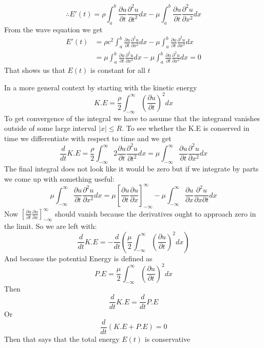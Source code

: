 \[
\therefore E'(t) = \rho \int_{a}^{b} \frac{\partial u}{\partial t}\frac{\partial^2 u}{\partial t^2} dx -\mu \int_{a}^{b} \frac{\partial u}{\partial t}\frac{\partial^2 u}{\partial x^2} dx    
\]
From the wave equation we get 
\begin{align*}
    E'(t) &= \rho c^2 \int_{a}^{b} \frac{\partial u}{\partial t}\frac{\partial^2 u}{\partial x^2} dx -\mu \int_{a}^{b} \frac{\partial u}{\partial t}\frac{\partial^2 u}{\partial x^2} dx    
    \\
    &= \mu \int_{a}^{b} \frac{\partial u}{\partial t}\frac{\partial^2 u}{\partial x^2} dx -\mu \int_{a}^{b} \frac{\partial u}{\partial t}\frac{\partial^2 u}{\partial x^2} dx = 0
\end{align*}
That shows us that $E(t)$ is constant for all $t$
\par
In a more general context by starting with the kinetic energy
\[
K.E = \frac{\rho}{2} \int_{-\infty}^{\infty} {\left(\frac{\partial u}{\partial t}\right)}^2 dx    
\]
To get convergence of the integral we have to assume that the integrand vanishes
outside of some large interval $|x| \leq R$.
To see whether the K.E is conserved in time
we differentiate with respect to time and we get
\[
\frac{d}{dt}K.E = \frac{\rho}{2} \int_{-\infty}^{\infty} 2\frac{\partial u}{\partial t}\frac{\partial^2 u}{\partial t^2} dx = \mu \int_{-\infty}^{\infty} \frac{\partial u}{\partial t}\frac{\partial^2 u}{\partial x^2} dx
\]
The final integral does not look like it would be zero but if we integrate by
parts we come up with something useful:
\[
    \mu \int_{-\infty}^{\infty} \frac{\partial u}{\partial t}\frac{\partial^2 u}{\partial x^2} dx = \mu \left[\frac{\partial u}{\partial t}\frac{\partial u}{\partial x}\right]_{-\infty}^{\infty} - \mu \int_{-\infty}^{\infty} \frac{\partial u}{\partial x}\frac{\partial^2 u}{\partial x \partial t} dx
\]
Now $\displaystyle \left[\frac{\partial u}{\partial t}\frac{\partial u}{\partial x}\right]_{-\infty}^{\infty} $ should vanish because the derivatives ought to approach zero in the limit. So we are left with:
\[
\frac{d}{dt}K.E = -\frac{d}{dt}\left(\frac{\mu}{2} \int_{-\infty}^{\infty} {\left(\frac{\partial u}{\partial t}\right)}^2 dx\right)
\]
And because the potential Energy is defined as 
\[
P.E = \frac{\mu}{2} \int_{-\infty}^{\infty} {\left(\frac{\partial u}{\partial t}\right)}^2 dx
\]
Then 
\[
   \frac{d}{dt}K.E = \frac{d}{dt}P.E 
\]
Or 
\[
\frac{d}{dt} \left(K.E + P.E \right) = 0    
\]
Then that says that the total energy $E(t)$ is conservative
